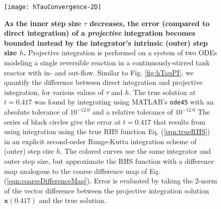 \documentclass[numbers]{frontiersSCNS}
\renewcommand{\vec}[1]{\bm{#1}}
\newcommand{\figRef}[1]{Fig. \ref{fig:#1}}
\newcommand{\eqnRef}[1]{Eq. (\ref{eqn:#1})}
\DeclareRobustCommand{\inTstep}{\tau}
\DeclareRobustCommand{\outTstep}{h}
\newcommand{\dhdtDeltaTVal}{0.417}
\newcommand{\dhdtrtolLogTen}{-12.0}
\newcommand{\dhdtatolLogTen}{-12.0}
\begin{document}
%
\setcounter{subfigure}{0}\begin{figure}[ht]
\centering
%
\texttt{[image: hTauConvergence-2D]}
\caption{
    \textbf{
        As the inner step size ${\inTstep}$ decreases,
        the error (compared to direct integration) of a {\em projective} integration
        becomes bounded instead by the integrator's intrinsic (outer) step size ${\outTstep}$.
    }
    Projective integration is performed
    on a system of two ODEs modeling a single reversible reaction in a
    continuously-stirred tank reactor with in- and out-flow.
    Similar to \figRef{hTauPI}, we
    quantify the difference
    between direct integration and projective integration,
    for various values of ${\inTstep}$ and ${\outTstep}$.
    The true solution at $t=\dhdtDeltaTVal$ was found by integrating
    using MATLAB's \texttt{ode45} with an
    absolute tolerance of $10^{\dhdtatolLogTen}$ and a 
    relative tolerance of $10^{\dhdtrtolLogTen}$
    The series of black circles give the error at $t=\dhdtDeltaTVal$
    that results from using integration using the true RHS function \eqnRef{trueRHS}
    in an explicit second-order Runge-Kutta integration scheme
    of (outer) step size ${\outTstep}$.
    The colored curves use the same integrator and outer step size,
    but approximate the RHS function with a difference map
    analogous to the coarse difference map of \eqnRef{coarseDifferenceMap}.
    Error is evaluated by taking the 2-norm of the vector difference
    between the projective integration solution $\vec x(\dhdtDeltaTVal)$
    and the true solution.
}
\label{fig:hTau2D}
\end{figure}
%
\end{document}

